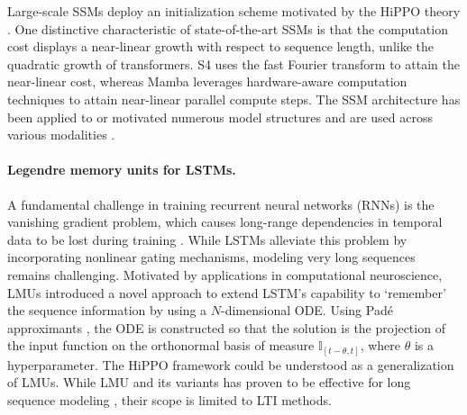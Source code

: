\documentclass{article}
\theoremstyle{definition}
\begin{document}
Large-scale SSMs deploy an initialization scheme motivated by the HiPPO theory \citep{gu2023train}. One distinctive characteristic of state-of-the-art SSMs is that the computation cost displays a near-linear growth with respect to sequence length, unlike the quadratic growth of transformers. S4 \citep{gu_efficiently_2022} uses the fast Fourier transform to attain the near-linear cost, whereas Mamba leverages hardware-aware computation techniques to attain near-linear parallel compute steps. The SSM architecture has been applied to or motivated numerous model structures \citep{fu2022hungry, hasani2022liquid, sun2023retentive, peng2023rwkv} and are used across various modalities \citep{zhu2024vision, li2025videomamba, shams2024ssamba}. 


\paragraph{Legendre memory units for LSTMs.}
A fundamental challenge in training recurrent neural networks (RNNs) is the vanishing gradient problem, which causes long-range dependencies in temporal data to be lost during training  \citep{bengio1994learning, le2015simple}. While LSTMs \citep{schmidhuber1997long} alleviate this problem by incorporating nonlinear gating mechanisms, modeling very long sequences remains challenging.
Motivated by applications in computational neuroscience, LMUs \citep{voelker2019dynamical, voelker2019legendre} introduced a novel approach to extend LSTM's capability to `remember' the sequence information by using a $N$-dimensional ODE. Using Pad\'{e} approximants \citep{pade1892representation}, the ODE is constructed so that the solution is the projection of the input function on the orthonormal basis of measure $\mathbb{I}_{[t-\theta, t]}$, where $\theta$ is a hyperparameter. 
The HiPPO framework could be understood as a generalization of LMUs. 
While LMU and its variants has proven to be effective for long sequence modeling \citep{liu_lmuformer_2024,zhang2023performance,  chilkuri_parallelizing_2021}, their scope is limited to LTI methods.
\end{document}
